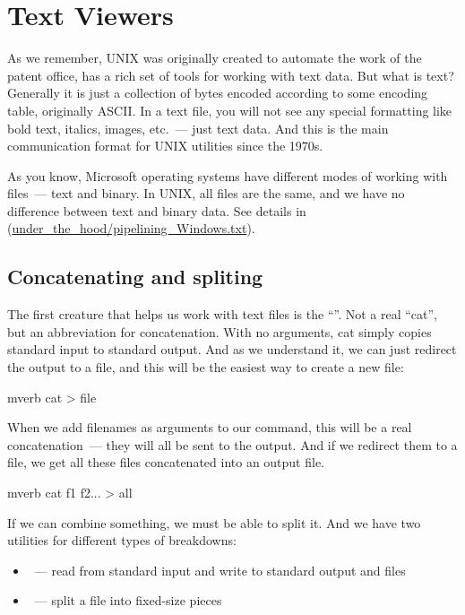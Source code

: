 \section*{Text Viewers}

As we remember, UNIX was originally created to automate the work of
the patent office, has a rich set of tools for working with text data.
But what is text? Generally it is just a collection of bytes encoded
according to some encoding table, originally ASCII. In a text file,
you will not see any special formatting like bold text, italics,
images, etc.~--- just text data. And this is the main communication format
for UNIX utilities since the 1970s.

As you know, Microsoft operating systems have different modes of working
with files~--- text and binary. In UNIX, all files are the same, and
we have no difference between text and binary data. See details in
(\url{under_the_hood/pipelining_Windows.txt}).

\subsection*{Concatenating and spliting}

The first creature that helps us work with text files is the ``''.
Not a real ``cat'', but an abbreviation for concatenation. With no arguments,
cat simply copies standard input to standard output. And as we understand it,
we can just redirect the output to a file, and this will be the easiest way
to create a new file:
\begin{code}{mverb}
cat > file
\end{code}
When we add filenames as arguments to our command, this will be a real
concatenation~--- they will all be sent to the output. And if we redirect them
to a file, we get all these files concatenated into an output file.
\begin{code}{mverb}
cat f1 f2... > all
\end{code}

If we can combine something, we must be able to split it.
And we have two utilities for different types of breakdowns:
\begin{itemize}
\item {}~--- read from standard input and write to standard output and
      files
\item {}~--- split a file into fixed-size pieces
\end{itemize}

